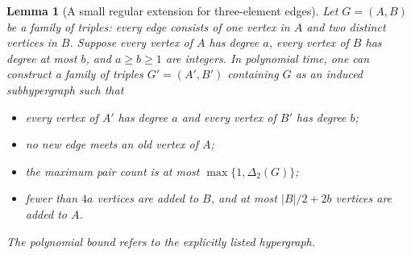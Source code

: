 \documentclass[11pt]{article}
\newtheorem{lemma}[theorem]{Lemma}
\theoremstyle{definition}\newtheorem{algorithm}{Algorithm}[section]
\numberwithin{equation}{section}
\theoremstyle{remark}\newtheorem*{remark}{Remark}
\begin{document}
\begin{lemma}[A small regular extension for three-element edges]
\label{lem:rank-three-regularization}
Let $G=(A,B)$ be a family of triples: every
edge consists of one vertex in $A$ and two distinct vertices in $B$.
Suppose every vertex of $A$ has degree $a$, every vertex of $B$ has
degree at most $b$, and $a\ge b\ge1$ are integers. In polynomial
time, one can construct a family of triples
$G'=(A',B')$ containing $G$ as an induced subhypergraph such that
\begin{itemize}
\item every vertex of $A'$ has degree $a$ and every vertex of $B'$
has degree $b$;
\item no new edge meets an old vertex of $A$;
\item the maximum pair count is at most
$\max\{1,\Delta_2(G)\}$;
\item fewer than $4a$ vertices are added to $B$, and at most
$|B|/2+2b$ vertices are added to $A$.
\end{itemize}
The polynomial bound refers to the explicitly listed hypergraph.
\end{lemma}
\end{document}
